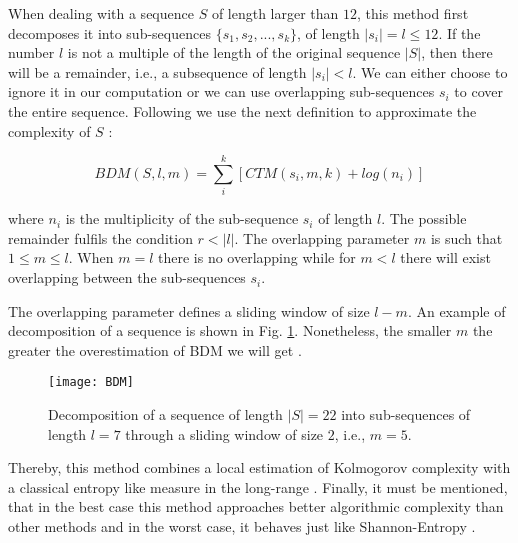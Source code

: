 When dealing with a sequence $S$ of length larger than $12$, this method first decomposes it into sub-sequences  $\{ s_{1}, s_{2}, ..., s_{k} \}$, of length $|s_{i}|=l \leq 12$. If the number $l$ is not a multiple of the length of the original sequence $|S|$, then there will be a remainder, i.e., a subsequence of length $|s_{i}|<l$. We can either choose to ignore it in our computation or we can use overlapping sub-sequences $s_{i}$ to cover the entire sequence. Following we use the next definition to approximate the complexity of $S$ \cite{decomposition}:

\begin{defn}

\begin{equation}
\label{bdm_eq}
BDM(S,l,m)=\sum_{i}^{k} [CTM(s_{i},m,k) + log(n_{i})]
\end{equation}

where $n_{i}$ is the multiplicity of the sub-sequence $s_{i}$ of length $l$. The possible remainder fulfils the condition $r<|l|$. The overlapping parameter $m$ is such that $1 \leq m \leq l$. When $m=l$ there is no overlapping while for $m<l$ there will exist overlapping between the sub-sequences $s_{i}$.
\end{defn}

The overlapping parameter defines a sliding window of size $l-m$. An example of decomposition of a sequence is shown in Fig. \ref{fig:BDM}. Nonetheless, the smaller $m$ the greater the overestimation of BDM we will get \cite{decomposition}.

\begin{figure}
	\centering
		\texttt{[image: BDM]}
	\caption[Decomposition of a sequence into sub-sequences.]{Decomposition of a sequence of length $|S|=22$ into sub-sequences of length $l=7$ through a sliding window of size $2$, i.e., $m=5$.}
	\label{fig:BDM}
\end{figure}

Thereby, this method combines a local estimation of Kolmogorov complexity with a classical entropy like measure in the long-range \cite{decomposition}.
Finally, it must be mentioned, that in the best case this method approaches better algorithmic complexity than other methods and in the worst case, it behaves just like Shannon-Entropy \cite{decomposition}.

